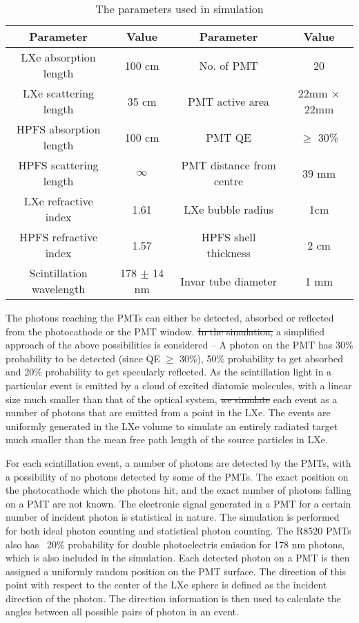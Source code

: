 \begin{table}[h]
  \centering
  \caption{The parameters used in simulation}
  \label{tab:OptPar}
  \begin{tabular}{|c c||c c|}
  \hline
  Parameter & Value & Parameter & Value \\
  \hline
  LXe absorption length & 100 cm & No. of PMT & 20\\
  LXe scattering length & 35 cm & PMT active area & 22mm $\times$ 22mm\\
  HPFS absorption length & 100 cm & PMT QE & $\geq$ 30\% \\
  HPFS scattering length & $\infty$ & PMT distance from centre & 39 mm\\
  LXe refractive index & 1.61 & LXe bubble radius & 1cm\\
  HPFS refractive index & 1.57 & HPFS shell thickness & 2 cm \\
  Scintillation wavelength & 178 $\pm$ 14 nm & Invar tube diameter & 1 mm\\
  \hline
 \end{tabular}
\end{table}

The photons reaching the PMTs can either be detected, absorbed or reflected from the photocathode 
or the PMT window. \sout{In the simulation,} a simplified approach of the above possibilities is considered -- 
A photon on the PMT has 30\% probability to be detected (since QE $\geq$ 30\%), 50\% probability to get 
absorbed and 20\% probability to get specularly reflected. As the scintillation light in a particular 
event is emitted by a cloud of excited diatomic molecules, with a linear size much smaller than that 
of the optical system, \sout{we simulate} each event  as a number of photons that are emitted from a point 
in the LXe. The events are uniformly generated in the LXe volume to simulate an entirely radiated 
target much smaller than the mean free path length of the source particles in LXe.

For each scintillation event, a number of photons are detected by the PMTs, with a possibility of 
no photons detected by some of the PMTs. The exact position on the photocathode which the photons hit, 
and the exact number of photons falling on a PMT are not known. The electronic signal generated in a PMT 
for a certain number of incident photon is statistical in nature. The simulation is performed for both 
ideal photon counting and statistical photon counting. The R8520 PMTs also has  ~20\% probability 
for double photoelectris emission for 178 nm photons, which is also included in the simulation.
Each detected photon 
on a PMT is then assigned a uniformly random position on the PMT surface. The direction of this point with respect 
to the center of the LXe sphere is defined as the incident direction of the photon. The direction information 
is then used to calculate the angles between all possible pairs of photon in an event.

